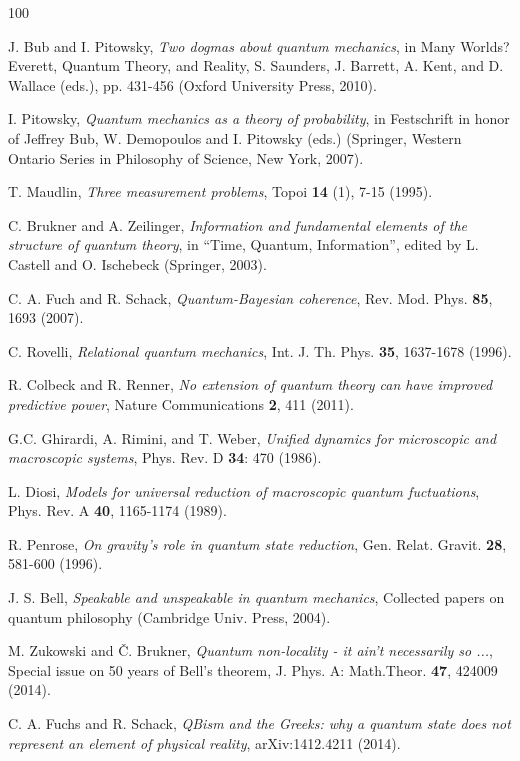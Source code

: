 \documentclass[12pt,a4]{article}
\begin{document}
\begin {thebibliography}{100}

 J. Bub and I. Pitowsky, {\it Two dogmas about quantum mechanics}, in Many Worlds? Everett, Quantum Theory, and Reality, S. Saunders, J. Barrett, A. Kent, and D. Wallace (eds.), pp. 431-456 (Oxford University Press, 2010).

 I. Pitowsky, {\it Quantum mechanics as a theory of probability}, in Festschrift in honor of Jeffrey Bub, W. Demopoulos and I. Pitowsky (eds.) (Springer, Western Ontario Series in Philosophy of Science, New York, 2007). 

 T. Maudlin, {\it Three measurement problems}, Topoi {\bf 14} (1), 7-15 (1995).

 C. Brukner and A. Zeilinger, {\it Information and fundamental elements of the structure of quantum theory}, in ``Time, Quantum, Information'', edited by L. Castell and O. Ischebeck (Springer, 2003).

 C. A. Fuch and R. Schack, {\it Quantum-Bayesian coherence}, Rev. Mod. Phys. {\bf 85}, 1693 (2007).

 C. Rovelli, {\it Relational quantum mechanics}, Int. J. Th. Phys. {\bf  35}, 1637-1678 (1996).

 R. Colbeck and R. Renner, {\it No extension of quantum theory can have improved predictive power}, Nature Communications {\bf 2}, 411 (2011).

 G.C. Ghirardi, A. Rimini, and T. Weber, {\it Unified dynamics for microscopic and macroscopic systems}, Phys. Rev. D {\bf 34}: 470 (1986).

 L. Diosi, {\it Models for universal reduction of macroscopic quantum fuctuations}, Phys. Rev. A {\bf 40}, 1165-1174
(1989).

 R. Penrose, {\it On gravity's role in quantum state reduction}, Gen. Relat. Gravit. {\bf 28}, 581-600 (1996).

 J. S. Bell, {\it Speakable and unspeakable in quantum mechanics}, Collected papers on quantum philosophy (Cambridge Univ. Press, 2004).

 M. Zukowski and  {\v C}. Brukner, {\it Quantum non-locality - it ain't necessarily so ...}, Special issue on 50 years of Bell's theorem, J. Phys. A: Math.Theor. {\bf 47}, 424009 (2014).

 C. A. Fuchs and R. Schack, {\it QBism and the Greeks: why a quantum state does not represent an element of physical reality}, arXiv:1412.4211 (2014). 


\end{thebibliography}
\end{document}
